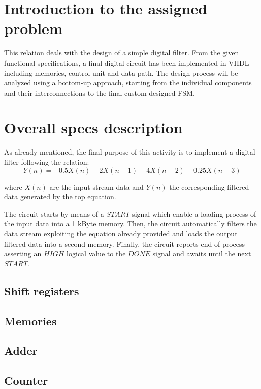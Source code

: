 \documentclass[12pt]{article}
\begin{document}
\newpage

\section*{Introduction to the assigned problem}
This relation deals with the design of a simple digital filter. From the given functional specifications, a final digital circuit has been implemented in VHDL including memories, control unit and data-path. 
\newline The design process will be analyzed using  a bottom-up approach, starting from the individual components and their interconnections to the final custom designed FSM.





\section*{Overall specs description}

As already mentioned, the final  purpose of this activity is to implement a digital filter following the relation:
\[Y(n) = -0.5X(n) - 2X(n-1) + 4X(n-2) + 0.25X(n-3) \]

where $ X(n) $ are the input stream data and $ Y(n) $ the corresponding filtered data generated by the top equation.

The circuit starts by means of a $START$ signal which enable a loading process of the input data into a 1 kByte memory. Then, the circuit automatically filters the data stream exploiting the equation already provided and loads the output filtered data into a second memory. Finally, the circuit reports end of process asserting an $HIGH$ logical value to the $DONE$ signal and awaits until the next $START$.

\subsection*{Shift registers}
\subsection*{Memories}
\subsection*{Adder}
\subsection*{Counter}


\end{document}
